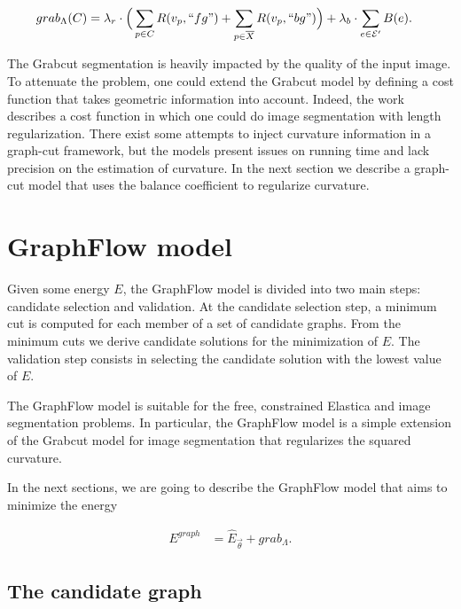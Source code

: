 \begin{align*}
	grab_{\Lambda}(C) &= \lambda_r \cdot \Big( \sum_{p \in C}{R(v_p,``fg")} + \sum_{p \in \overline{X}}{R(v_p,``bg")} \Big) + \lambda_b \cdot \sum_{e \in \mathcal{E}'}{B(e)}.
\end{align*}


The Grabcut segmentation is heavily impacted by the quality of the input image. To attenuate the problem, one could extend the Grabcut model by defining a cost function that takes geometric information into account. Indeed, the work \cite{boykov03geodesics} describes a cost function in which one could do image segmentation with length regularization. There exist some attempts \cite{nieuwenhuis14efficient,zehiry10fast} to inject curvature information in a graph-cut framework, but the models present issues on running time and lack precision on the estimation of curvature. In the next section we describe a graph-cut model that uses the balance coefficient to regularize curvature.


\section{GraphFlow model}
Given some energy $E$, the GraphFlow model is divided into two main steps: candidate selection and validation. At the candidate selection step, a minimum cut is computed for each member of a set of candidate graphs. From the minimum cuts we derive candidate solutions for the minimization of $E$. The validation step consists in selecting the candidate solution with the lowest value of $E$.

The GraphFlow model is suitable for the free, constrained Elastica and image segmentation problems. In particular, the GraphFlow model is a simple extension of the Grabcut model for image segmentation that regularizes the squared curvature.

In the next sections, we are going to describe the GraphFlow model that aims to minimize the energy

\begin{align}
E^{graph} &= \hat{E}_{\vec{\theta}} + grab_{\Lambda}.
\label{ch8:eq:graphflow-energy}
\end{align}


\subsection{The candidate graph}


